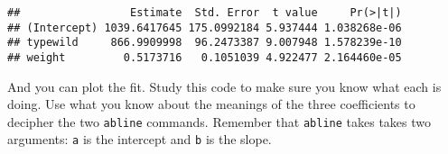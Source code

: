 \documentclass[]{book}
\newenvironment{Shaded}{\begin{snugshade}}{\end{snugshade}}
\newcommand{\KeywordTok}[1]{\textcolor[rgb]{0.13,0.29,0.53}{\textbf{#1}}}
\newcommand{\DataTypeTok}[1]{\textcolor[rgb]{0.13,0.29,0.53}{#1}}
\newcommand{\DecValTok}[1]{\textcolor[rgb]{0.00,0.00,0.81}{#1}}
\newcommand{\FloatTok}[1]{\textcolor[rgb]{0.00,0.00,0.81}{#1}}
\newcommand{\StringTok}[1]{\textcolor[rgb]{0.31,0.60,0.02}{#1}}
\newcommand{\OperatorTok}[1]{\textcolor[rgb]{0.81,0.36,0.00}{\textbf{#1}}}
\newcommand{\NormalTok}[1]{#1}
\theoremstyle{definition}
\theoremstyle{definition}
\theoremstyle{definition}
\theoremstyle{remark}
\begin{document}
\begin{Shaded}
\end{Shaded}

\begin{verbatim}
##                 Estimate  Std. Error  t value     Pr(>|t|)
## (Intercept) 1039.6417645 175.0992184 5.937444 1.038268e-06
## typewild     866.9909998  96.2473387 9.007948 1.578239e-10
## weight         0.5173716   0.1051039 4.922477 2.164460e-05
\end{verbatim}

And you can plot the fit. Study this code to make sure you know what
each is doing. Use what you know about the meanings of the three
coefficients to decipher the two \texttt{abline} commands. Remember that
\texttt{abline} takes takes two arguments: \texttt{a} is the intercept
and \texttt{b} is the slope.

\begin{Shaded}
\end{Shaded}
\end{document}
